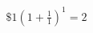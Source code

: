 \documentclass[preview]{standalone}
\begin{document}
\begin{align*}
\$1\left( 1+\frac{1}{1} \right)^{1} = 2
\end{align*}
\end{document}
